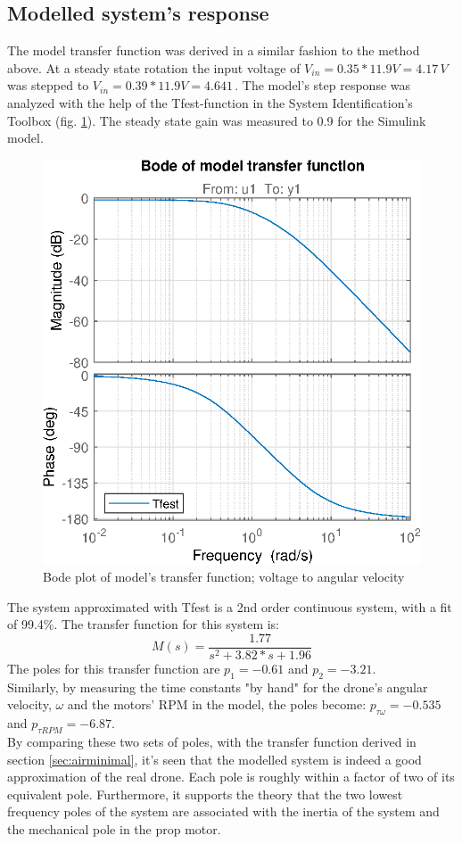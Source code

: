 \subsection{Modelled system's response}\label{sec:modelresponse}
The model transfer function was derived in a similar fashion to the method above. At a steady state rotation the input voltage of $V_{in} = 0.35*11.9V = 4.17 \,V$ was stepped to $V_{in} = 0.39*11.9V = 4.641\,$. The model's step response was analyzed with the help of the Tfest-function in the System Identification's Toolbox (fig. \ref{fig:bode_tfest}). The steady state gain was measured to 0.9 for the Simulink model.
\begin{figure}[h]
    \centering
    \includegraphics{figures/results/bode_tfest.eps}
    \caption{Bode plot of model's transfer function; voltage to angular velocity}
    \label{fig:bode_tfest}
\end{figure}
The system approximated with Tfest is a 2nd order continuous system, with a fit of 99.4\%. The transfer function for this system is: 
\begin{equation}
    M(s) = \frac{1.77}{s^2+3.82*s+1.96}   
\end{equation}
The poles for this transfer function are $p_1 = -0.61$ and $p_2 = -3.21$. \\
Similarly, by measuring the time constants "by hand" for the drone's angular velocity, $\omega$ and the motors' RPM in the model, the poles become: $p_{\tau \omega} = -0.535$ and $p_{\tau RPM} = -6.87$.  \\
By comparing these two sets of poles, with the transfer function derived in section \ref{sec:airminimal}, it's seen that the modelled system is indeed a good approximation of the real drone. Each pole is roughly within a factor of two of its equivalent pole. Furthermore, it supports the theory that the two lowest frequency poles of the system are associated with the inertia of the system and the mechanical pole in the prop motor.


